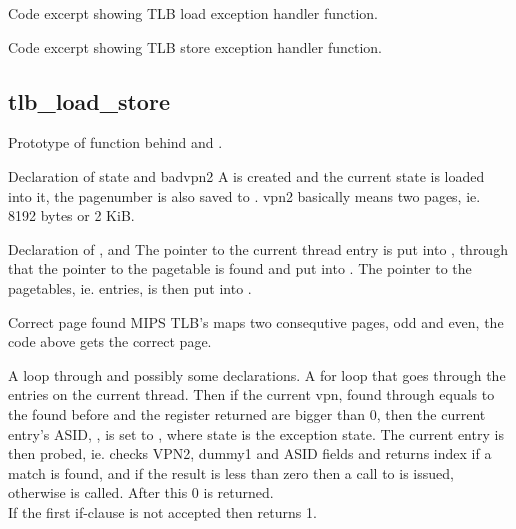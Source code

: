 {Code excerpt showing TLB load exception handler function.}

{Code excerpt showing TLB store exception handler function.}


\subsection{tlb\_load\_store}
    {Prototype of function behind  and
                          .}

    {Declaration of state and badvpn2}
A  is created and the current state is loaded
into it, the pagenumber is also saved to . vpn2
basically means two pages, ie. 8192 bytes or 2 KiB.


    {Declaration of ,  and }
The pointer to the current thread entry is put into , through
that the pointer to the pagetable is found and put into . The
pointer to the pagetables, ie. entries, is then put into .

    {Correct page found}
MIPS TLB's maps two consequtive pages, odd and even, the code above gets the
correct page.

    {A loop through  and possibly some declarations.}
A for loop that goes through the entries on the current thread. Then if the
current vpn, found through  equals to the 
found before and the register returned are bigger than 0, then the current entry's ASID,
, is set to , where state is the
exception state. The current entry is then probed, ie. checks VPN2, dummy1 and
ASID fields and returns index if a match is found, and if the result is less than
zero then a call to  is issued, otherwise
 is called. After this 0 is returned. \\
If the first if-clause is not accepted then 
returns 1.

